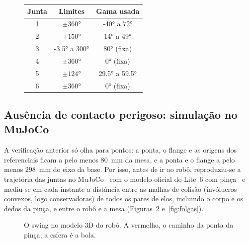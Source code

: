 \begin{figure}[H]
\centering
\begin{minipage}[c]{0.40\textwidth}
\centering
\small
{}
\label{tab:juntas}
\begin{tabular}{@{}ccc@{}}
\toprule
\rowcolor{tabcab}
Junta & Limites & Gama usada \\
\midrule
1 & $\pm\ang{360}$         & \ang{-40} a \ang{72}  \\
2 & $\pm\ang{150}$         & \ang{14} a \ang{49}  \\
3 & \ang{-3.5} a \ang{300} & \ang{80} (fixa)  \\
4 & $\pm\ang{360}$         & \ang{0} (fixa) \\
5 & $\pm\ang{124}$         & \ang{29.5} a \ang{59.5}  \\
6 & $\pm\ang{360}$         & \ang{0} (fixa) \\
\bottomrule
\end{tabular}
\end{minipage}\hfill
\begin{minipage}[c]{0.57\textwidth}
\centering
{}
\label{fig:juntas}
\end{minipage}
\end{figure}

\subsection{Ausência de contacto perigoso: simulação no MuJoCo}
\label{sec:contacto}

A verificação anterior só olha para pontos: a ponta, o flange e as origens
dos referenciais ficam a pelo menos \SI{80}{\milli\meter} da mesa, e a
ponta e o flange a pelo menos \SI{298}{\milli\meter} do eixo da base. Por isso, antes de ir ao robô,
reproduziu-se a trajetória das juntas no MuJoCo~\cite{todorov2012} com o
modelo oficial do Lite~6 com pinça~\cite{menagerie2022} e mediu-se em cada
instante a distância entre as malhas de colisão (invólucros convexos, logo
conservadoras) de todos os pares de elos, incluindo o corpo e os dedos da
pinça, e entre o robô e a mesa (Figuras~\ref{fig:seq} e~\ref{fig:folgas}).

\begin{figure}[H]
\centering
{}
\caption{O swing no modelo 3D do robô. A vermelho, o caminho da ponta da
pinça; a esfera é a bola.}
\label{fig:seq}
\end{figure}

